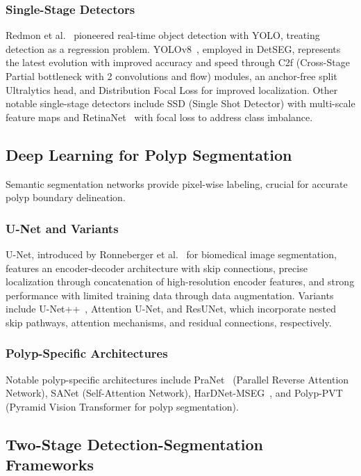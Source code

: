 \documentclass[conference]{IEEEtran}
\begin{document}
\subsubsection{Single-Stage Detectors}
Redmon et al.~\cite{redmon2016} pioneered real-time object detection with YOLO, treating detection as a regression problem. YOLOv8~\cite{jocher2023}, employed in DetSEG, represents the latest evolution with improved accuracy and speed through C2f (Cross-Stage Partial bottleneck with 2 convolutions and flow) modules, an anchor-free split Ultralytics head, and Distribution Focal Loss for improved localization. Other notable single-stage detectors include SSD (Single Shot Detector) with multi-scale feature maps and RetinaNet~\cite{lin2017} with focal loss to address class imbalance.

\subsection{Deep Learning for Polyp Segmentation}

Semantic segmentation networks provide pixel-wise labeling, crucial for accurate polyp boundary delineation.

\subsubsection{U-Net and Variants}
U-Net, introduced by Ronneberger et al.~\cite{ronneberger2015} for biomedical image segmentation, features an encoder-decoder architecture with skip connections, precise localization through concatenation of high-resolution encoder features, and strong performance with limited training data through data augmentation. Variants include U-Net++~\cite{zhou2018}, Attention U-Net, and ResUNet, which incorporate nested skip pathways, attention mechanisms, and residual connections, respectively.

\subsubsection{Polyp-Specific Architectures}
Notable polyp-specific architectures include PraNet~\cite{fan2020} (Parallel Reverse Attention Network), SANet (Self-Attention Network), HarDNet-MSEG~\cite{huang2021}, and Polyp-PVT~\cite{dong2021} (Pyramid Vision Transformer for polyp segmentation).

\subsection{Two-Stage Detection-Segmentation Frameworks}
\end{document}
